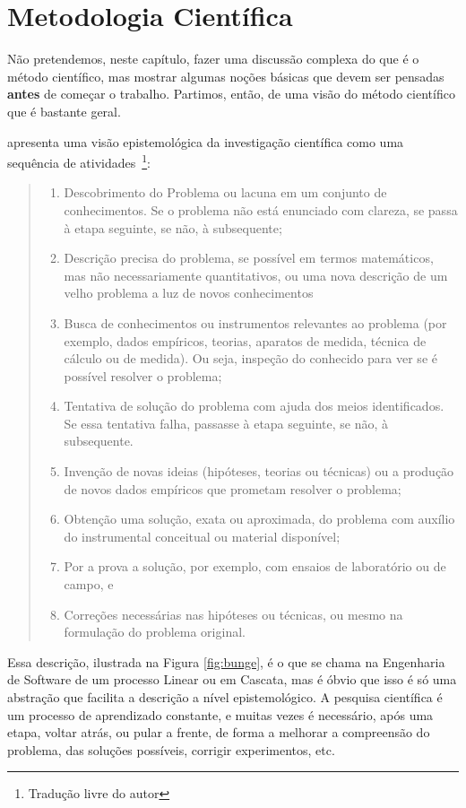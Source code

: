 \chapter{Metodologia Científica}

Não pretendemos, neste capítulo, fazer uma discussão complexa do que é o método científico, mas mostrar algumas noções básicas que devem ser pensadas \textbf{antes} de começar o trabalho. 
Partimos, então, de uma visão do método científico que é bastante geral.

\citet{Bunge2002} apresenta uma visão epistemológica da investigação científica como uma sequência de atividades~\citep[p. 39-40]{Bunge2002}\footnote{Tradução livre do autor}:
\begin{quote}
\begin{enumerate}
    \item Descobrimento do Problema ou lacuna em um conjunto de conhecimentos. Se o problema não está enunciado com clareza, se passa à etapa seguinte, se não, à subsequente;
    \item Descrição precisa do problema, se possível em termos matemáticos, mas não necessariamente quantitativos, ou uma nova descrição de um velho problema a luz de novos conhecimentos 
    \item Busca de conhecimentos ou instrumentos relevantes ao problema (por exemplo, dados empíricos, teorias, aparatos de medida, técnica de cálculo ou de medida). Ou seja, inspeção do conhecido para ver se é possível resolver o problema;
    \item Tentativa de solução do problema com ajuda dos meios identificados. Se essa tentativa falha, passasse à etapa seguinte, se não, à subsequente.
    \item Invenção de novas ideias (hipóteses, teorias ou técnicas) ou a produção de novos dados empíricos que prometam resolver o problema;
    \item Obtenção uma solução, exata ou aproximada, do problema com auxílio do instrumental conceitual ou material disponível;
    \item Por a prova a solução, por exemplo, com ensaios de laboratório ou de campo, e
    \item Correções necessárias nas hipóteses ou técnicas, ou mesmo na formulação do problema original.
\end{enumerate}
\end{quote}

Essa descrição, ilustrada na Figura \ref{fig:bunge}, é o que se chama na Engenharia de Software de um processo Linear ou em Cascata, mas é óbvio que isso é só uma abstração que facilita a descrição a nível epistemológico. A pesquisa científica é um processo de aprendizado constante, e muitas vezes é necessário, após uma etapa, voltar atrás, ou pular a frente, de forma a melhorar a compreensão do problema, das soluções possíveis, corrigir experimentos, etc.



